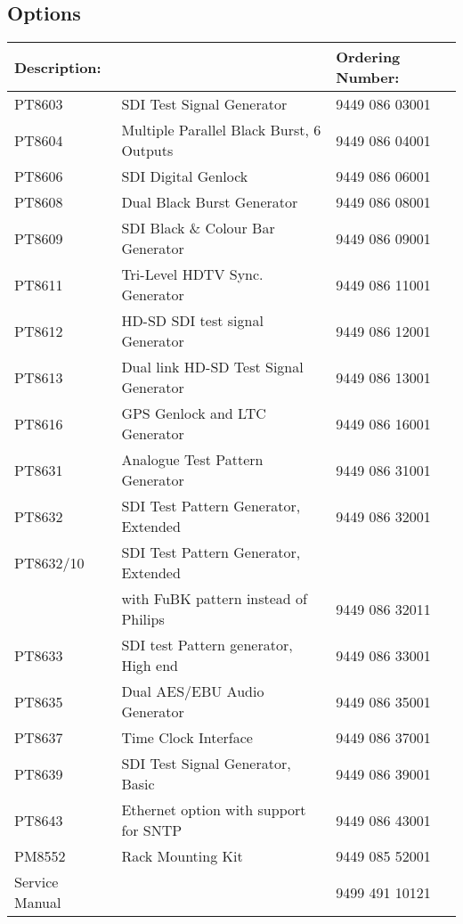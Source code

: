 \subsection{Options}
\begin{tabular*}{\textwidth}{@{\extracolsep{\fill}}l l l}
\hline
Description: 							& &	Ordering Number: \\
\hline
PT8603	& SDI Test Signal Generator 								& 9449 086 03001 \\
PT8604	& Multiple Parallel Black Burst, 6 Outputs 	& 9449 086 04001 \\
PT8606	& SDI Digital Genlock											& 9449 086 06001 \\
PT8608	& Dual Black Burst Generator								& 9449 086 08001 \\
PT8609	& SDI Black \& Colour Bar Generator					& 9449 086 09001 \\
PT8611	& Tri-Level HDTV Sync. Generator						& 9449 086 11001 \\
PT8612	& HD-SD SDI test signal Generator						& 9449 086 12001 \\
PT8613	& Dual link HD-SD Test Signal Generator			& 9449 086 13001 \\
PT8616	& GPS Genlock and LTC Generator							& 9449 086 16001 \\
PT8631	& Analogue Test Pattern Generator						& 9449 086 31001 \\
PT8632	& SDI Test Pattern Generator, Extended 			& 9449 086 32001 \\
PT8632/10	& SDI Test Pattern Generator, Extended &   \\
						& with FuBK pattern instead of Philips & 9449 086 32011 \\
PT8633	& SDI test Pattern generator, High end				& 9449 086 33001 \\
PT8635	& Dual AES/EBU Audio Generator								& 9449 086 35001 \\
PT8637	& Time Clock Interface													& 9449 086 37001 \\
PT8639	& SDI Test Signal Generator, Basic							& 9449 086 39001 \\
PT8643	& Ethernet option with support for SNTP 				& 9449 086 43001 \\
PM8552	& Rack Mounting Kit														& 9449 085 52001 \\
Service Manual	&																		& 9499 491 10121 \\
\end{tabular*}
